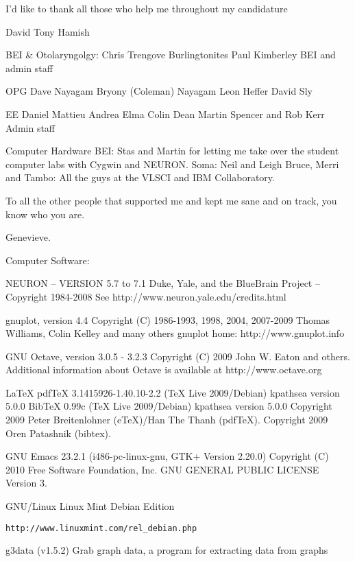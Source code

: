 
\begin{acknowledgements}

	I'd like to thank all those who help me throughout my candidature

David
Tony
Hamish

BEI \& Otolaryngolgy: Chris Trengove
Burlingtonites
Paul
Kimberley
BEI and admin staff

OPG
Dave Nayagam
Bryony (Coleman) Nayagam 
Leon Heffer
David Sly

EE
Daniel
Mattieu
Andrea
Elma
Colin
Dean
Martin Spencer and Rob Kerr
Admin staff

Computer Hardware
BEI: Stas and Martin for letting me take over the student computer labs with Cygwin and NEURON\@.
Soma: Neil and Leigh
Bruce, Merri and Tambo: All the guys at the VLSCI and IBM Collaboratory.




To all the other people that supported me and kept me sane and on track, you know who you are.

Genevieve.





Computer Software:

NEURON -- VERSION 5.7 to 7.1
Duke, Yale, and the BlueBrain Project -- Copyright 1984-2008
See {http://www.neuron.yale.edu/credits.html}

gnuplot, version 4.4 
Copyright (C) 1986-1993, 1998, 2004, 2007-2009
Thomas Williams, Colin Kelley and many others
gnuplot home:     http://www.gnuplot.info

GNU Octave, version 3.0.5 - 3.2.3
Copyright (C) 2009 John W. Eaton and others.
Additional information about Octave is available at
{http://www.octave.org}

LaTeX 
pdfTeX 3.1415926-1.40.10-2.2 (TeX Live 2009/Debian)
kpathsea version 5.0.0
BibTeX 0.99c (TeX Live 2009/Debian)
kpathsea version 5.0.0
Copyright 2009 Peter Breitenlohner (eTeX)/Han The Thanh (pdfTeX).
Copyright 2009 Oren Patashnik (bibtex).

GNU Emacs 23.2.1 (i486-pc-linux-gnu, GTK+ Version 2.20.0)
Copyright (C) 2010 Free Software Foundation, Inc.
GNU GENERAL PUBLIC LICENSE Version 3.


GNU/Linux
Linux Mint Debian Edition
\begin{verbatim}
http://www.linuxmint.com/rel_debian.php
\end{verbatim}

g3data (v1.5.2)  
Grab graph data, a program for extracting data from graphs


\end{acknowledgements}

